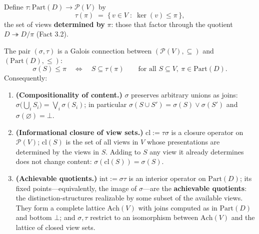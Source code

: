 

\begin{thmdef}

Define \(\tau : \mathrm{Part}(D) \to \mathcal{P}(V)\) by
\[
\tau(\pi) \;=\; \{\, v \in V \;:\; \ker(v) \le \pi \,\},
\]
the set of views \textbf{determined by} \(\pi\): those that factor through the quotient \(D \twoheadrightarrow D/\pi\) (Fact 3.2).
\end{thmdef}

\begin{thmplain}

The pair \((\sigma, \tau)\) is a Galois connection between \((\mathcal{P}(V), \subseteq)\) and \((\mathrm{Part}(D), \le)\):
\[
\sigma(S) \le \pi \quad \iff \quad S \subseteq \tau(\pi) \qquad \text{for all } S \subseteq V,\ \pi \in \mathrm{Part}(D).
\]
Consequently:

\begin{enumerate}
\def\labelenumi{\arabic{enumi}.}
\tightlist
\item
  \textbf{(Compositionality of content.)} \(\sigma\) preserves arbitrary unions as joins: \(\sigma\big(\bigcup_i S_i\big) = \bigvee_i \sigma(S_i)\); in particular \(\sigma(S \cup S') = \sigma(S) \vee \sigma(S')\) and \(\sigma(\varnothing) = \bot\).
\item
  \textbf{(Informational closure of view sets.)} \(\mathrm{cl} := \tau\sigma\) is a closure operator on \(\mathcal{P}(V)\); \(\mathrm{cl}(S)\) is the set of all views in \(V\) whose presentations are determined by the views in \(S\). Adding to \(S\) any view it already determines does not change content: \(\sigma(\mathrm{cl}(S)) = \sigma(S)\).
\item
  \textbf{(Achievable quotients.)} \(\mathrm{int} := \sigma\tau\) is an interior operator on \(\mathrm{Part}(D)\); its fixed points---\hspace{0pt}equivalently, the image of \(\sigma\)---\hspace{0pt}are the \textbf{achievable quotients}: the distinction-structures realizable by some subset of the available views. They form a complete lattice \(\mathrm{Ach}(V)\) with joins computed as in \(\mathrm{Part}(D)\) and bottom \(\bot\); and \(\sigma, \tau\) restrict to an isomorphism between \(\mathrm{Ach}(V)\) and the lattice of closed view sets.
\end{enumerate}
\end{thmplain}

